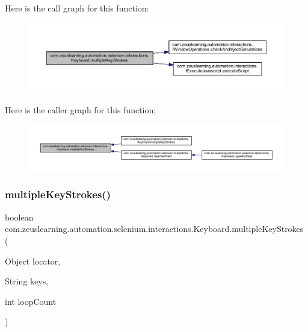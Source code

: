 Here is the call graph for this function\+:
\nopagebreak
\begin{figure}[H]
\begin{center}
\leavevmode
\includegraphics[width=350pt]{d1/d26/classcom_1_1zeuslearning_1_1automation_1_1selenium_1_1interactions_1_1Keyboard_af0c2d93c6dca53eea5fe996df3f85af7_cgraph}
\end{center}
\end{figure}
Here is the caller graph for this function\+:
\nopagebreak
\begin{figure}[H]
\begin{center}
\leavevmode
\includegraphics[width=350pt]{d1/d26/classcom_1_1zeuslearning_1_1automation_1_1selenium_1_1interactions_1_1Keyboard_af0c2d93c6dca53eea5fe996df3f85af7_icgraph}
\end{center}
\end{figure}
\hypertarget{classcom_1_1zeuslearning_1_1automation_1_1selenium_1_1interactions_1_1Keyboard_a99da211274aa02b2c3611d1db275996f}{}\label{classcom_1_1zeuslearning_1_1automation_1_1selenium_1_1interactions_1_1Keyboard_a99da211274aa02b2c3611d1db275996f} 
\subsubsection{\texorpdfstring{multiple\+Key\+Strokes()}{multipleKeyStrokes()}\hspace{0.1cm}{\footnotesize\ttfamily [2/2]}}
{\footnotesize\ttfamily boolean com.\+zeuslearning.\+automation.\+selenium.\+interactions.\+Keyboard.\+multiple\+Key\+Strokes (\begin{DoxyParamCaption}\item[{Object}]{locator,  }\item[{String}]{keys,  }\item[{int}]{loop\+Count }\end{DoxyParamCaption})\hspace{0.3cm}{\ttfamily [inline]}}

